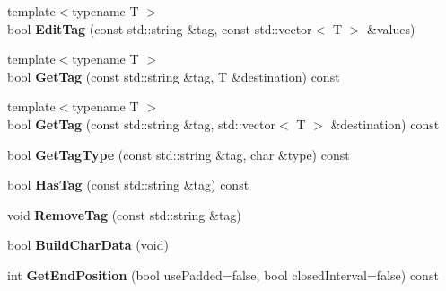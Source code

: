 \begin{DoxyCompactItemize}
\item 
\hypertarget{structBamTools_1_1BamAlignment_afa96020f82b5cd0d4f0e7684026fc820}{{\footnotesize template$<$typename T $>$ }\\bool {\bfseries Edit\-Tag} (const std\-::string \&tag, const std\-::vector$<$ T $>$ \&values)}\label{structBamTools_1_1BamAlignment_afa96020f82b5cd0d4f0e7684026fc820}

\item 
\hypertarget{structBamTools_1_1BamAlignment_a7fc5c3ff941b615ed96c61f3282a4ce8}{{\footnotesize template$<$typename T $>$ }\\bool {\bfseries Get\-Tag} (const std\-::string \&tag, T \&destination) const }\label{structBamTools_1_1BamAlignment_a7fc5c3ff941b615ed96c61f3282a4ce8}

\item 
\hypertarget{structBamTools_1_1BamAlignment_a31885d1f63897d4a93dc098b26e58c78}{{\footnotesize template$<$typename T $>$ }\\bool {\bfseries Get\-Tag} (const std\-::string \&tag, std\-::vector$<$ T $>$ \&destination) const }\label{structBamTools_1_1BamAlignment_a31885d1f63897d4a93dc098b26e58c78}

\item 
\hypertarget{structBamTools_1_1BamAlignment_acfca518b744a3854e89cafd011fedb67}{bool {\bfseries Get\-Tag\-Type} (const std\-::string \&tag, char \&type) const }\label{structBamTools_1_1BamAlignment_acfca518b744a3854e89cafd011fedb67}

\item 
\hypertarget{structBamTools_1_1BamAlignment_aeb66194cf0d3a77c5645972503bb813a}{bool {\bfseries Has\-Tag} (const std\-::string \&tag) const }\label{structBamTools_1_1BamAlignment_aeb66194cf0d3a77c5645972503bb813a}

\item 
\hypertarget{structBamTools_1_1BamAlignment_a66324f61772bb5431193768dc5a7f987}{void {\bfseries Remove\-Tag} (const std\-::string \&tag)}\label{structBamTools_1_1BamAlignment_a66324f61772bb5431193768dc5a7f987}

\item 
\hypertarget{structBamTools_1_1BamAlignment_a83d8f79ff75d16196cb6d060029c3dd5}{bool {\bfseries Build\-Char\-Data} (void)}\label{structBamTools_1_1BamAlignment_a83d8f79ff75d16196cb6d060029c3dd5}

\item 
\hypertarget{structBamTools_1_1BamAlignment_a316d14d2dccaa5bb4a2fab0fc3d2b15a}{int {\bfseries Get\-End\-Position} (bool use\-Padded=false, bool closed\-Interval=false) const }\label{structBamTools_1_1BamAlignment_a316d14d2dccaa5bb4a2fab0fc3d2b15a}


\end{DoxyCompactItemize}
